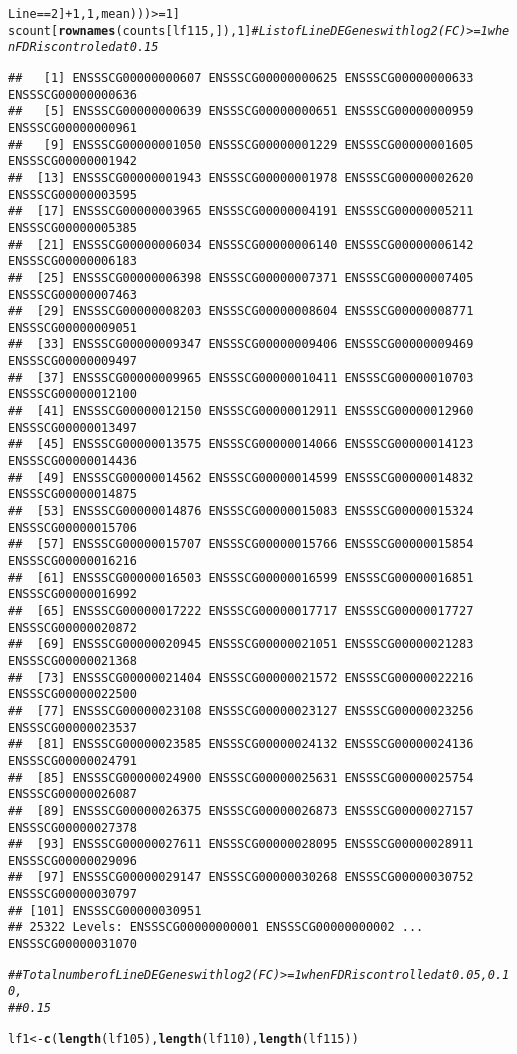 \documentclass{article}\usepackage[]{graphicx}\usepackage[]{color}
\makeatletter
\newcommand{\hlnum}[1]{\textcolor[rgb]{0.686,0.059,0.569}{#1}}%
\newcommand{\hlcom}[1]{\textcolor[rgb]{0.678,0.584,0.686}{\textit{#1}}}%
\newcommand{\hlopt}[1]{\textcolor[rgb]{0,0,0}{#1}}%
\newcommand{\hlstd}[1]{\textcolor[rgb]{0.345,0.345,0.345}{#1}}%
\newcommand{\hlkwb}[1]{\textcolor[rgb]{0.69,0.353,0.396}{#1}}%
\newcommand{\hlkwd}[1]{\textcolor[rgb]{0.737,0.353,0.396}{\textbf{#1}}}%
\newenvironment{kframe}{%
 \def\at@end@of@kframe{}%
 \ifinner\ifhmode%
  \def\at@end@of@kframe{\end{minipage}}%
  \begin{minipage}{\columnwidth}%
 \fi\fi%
 \def\FrameCommand##1{\hskip\@totalleftmargin \hskip-\fboxsep
 \colorbox{shadecolor}{##1}\hskip-\fboxsep
     \hskip-\linewidth \hskip-\@totalleftmargin \hskip\columnwidth}%
 \MakeFramed {\advance\hsize-\width
   \@totalleftmargin\z@ \linewidth\hsize
   \@setminipage}}%
 {\par\unskip\endMakeFramed%
 \at@end@of@kframe}
\newenvironment{knitrout}{}{} %
\makeatother
\begin{document}
\begin{knitrout}
\begin{kframe}
\begin{alltt}
    \hlstd{Line} \hlopt{==} \hlnum{2}\hlstd{]} \hlopt{+} \hlnum{1}\hlstd{,} \hlnum{1}\hlstd{, mean)))} \hlopt{>=} \hlnum{1}\hlstd{]}
\hlstd{scount[}\hlkwd{rownames}\hlstd{(counts[lf115, ]),} \hlnum{1}\hlstd{]}  \hlcom{# List of  Line DE Genes with log2(FC) >=1 when FDR is controled at 0.15}
\end{alltt}
\begin{verbatim}
##   [1] ENSSSCG00000000607 ENSSSCG00000000625 ENSSSCG00000000633 ENSSSCG00000000636
##   [5] ENSSSCG00000000639 ENSSSCG00000000651 ENSSSCG00000000959 ENSSSCG00000000961
##   [9] ENSSSCG00000001050 ENSSSCG00000001229 ENSSSCG00000001605 ENSSSCG00000001942
##  [13] ENSSSCG00000001943 ENSSSCG00000001978 ENSSSCG00000002620 ENSSSCG00000003595
##  [17] ENSSSCG00000003965 ENSSSCG00000004191 ENSSSCG00000005211 ENSSSCG00000005385
##  [21] ENSSSCG00000006034 ENSSSCG00000006140 ENSSSCG00000006142 ENSSSCG00000006183
##  [25] ENSSSCG00000006398 ENSSSCG00000007371 ENSSSCG00000007405 ENSSSCG00000007463
##  [29] ENSSSCG00000008203 ENSSSCG00000008604 ENSSSCG00000008771 ENSSSCG00000009051
##  [33] ENSSSCG00000009347 ENSSSCG00000009406 ENSSSCG00000009469 ENSSSCG00000009497
##  [37] ENSSSCG00000009965 ENSSSCG00000010411 ENSSSCG00000010703 ENSSSCG00000012100
##  [41] ENSSSCG00000012150 ENSSSCG00000012911 ENSSSCG00000012960 ENSSSCG00000013497
##  [45] ENSSSCG00000013575 ENSSSCG00000014066 ENSSSCG00000014123 ENSSSCG00000014436
##  [49] ENSSSCG00000014562 ENSSSCG00000014599 ENSSSCG00000014832 ENSSSCG00000014875
##  [53] ENSSSCG00000014876 ENSSSCG00000015083 ENSSSCG00000015324 ENSSSCG00000015706
##  [57] ENSSSCG00000015707 ENSSSCG00000015766 ENSSSCG00000015854 ENSSSCG00000016216
##  [61] ENSSSCG00000016503 ENSSSCG00000016599 ENSSSCG00000016851 ENSSSCG00000016992
##  [65] ENSSSCG00000017222 ENSSSCG00000017717 ENSSSCG00000017727 ENSSSCG00000020872
##  [69] ENSSSCG00000020945 ENSSSCG00000021051 ENSSSCG00000021283 ENSSSCG00000021368
##  [73] ENSSSCG00000021404 ENSSSCG00000021572 ENSSSCG00000022216 ENSSSCG00000022500
##  [77] ENSSSCG00000023108 ENSSSCG00000023127 ENSSSCG00000023256 ENSSSCG00000023537
##  [81] ENSSSCG00000023585 ENSSSCG00000024132 ENSSSCG00000024136 ENSSSCG00000024791
##  [85] ENSSSCG00000024900 ENSSSCG00000025631 ENSSSCG00000025754 ENSSSCG00000026087
##  [89] ENSSSCG00000026375 ENSSSCG00000026873 ENSSSCG00000027157 ENSSSCG00000027378
##  [93] ENSSSCG00000027611 ENSSSCG00000028095 ENSSSCG00000028911 ENSSSCG00000029096
##  [97] ENSSSCG00000029147 ENSSSCG00000030268 ENSSSCG00000030752 ENSSSCG00000030797
## [101] ENSSSCG00000030951
## 25322 Levels: ENSSSCG00000000001 ENSSSCG00000000002 ... ENSSSCG00000031070
\end{verbatim}
\begin{alltt}
\hlcom{## Total number of Line DE Genes with log2(FC) >=1 when FDR is controlled at 0.05, 0.10,}
\hlcom{## 0.15}

\hlstd{lf1} \hlkwb{<-} \hlkwd{c}\hlstd{(}\hlkwd{length}\hlstd{(lf105),} \hlkwd{length}\hlstd{(lf110),} \hlkwd{length}\hlstd{(lf115))}
\end{alltt}
\end{kframe}
\end{knitrout}
\end{document}
